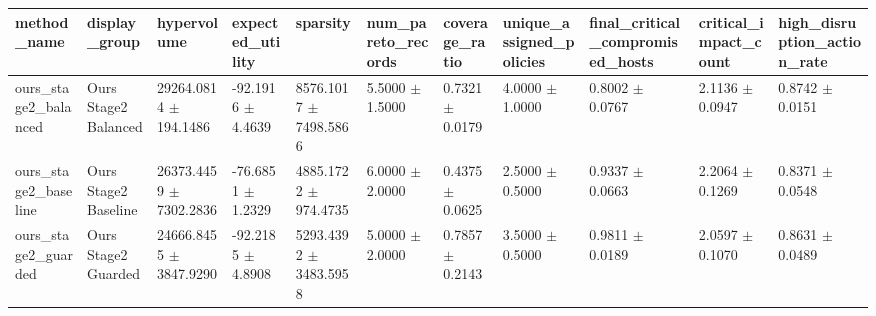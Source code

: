 \begin{tabular}{lllllllllll}
\hline
method_name & display_group & hypervolume & expected_utility & sparsity & num_pareto_records & coverage_ratio & unique_assigned_policies & final_critical_compromised_hosts & critical_impact_count & high_disruption_action_rate \\
\hline
ours_stage2_balanced & Ours Stage2 Balanced & 29264.0814 $\pm$ 194.1486 & -92.1916 $\pm$ 4.4639 & 8576.1017 $\pm$ 7498.5866 & 5.5000 $\pm$ 1.5000 & 0.7321 $\pm$ 0.0179 & 4.0000 $\pm$ 1.0000 & 0.8002 $\pm$ 0.0767 & 2.1136 $\pm$ 0.0947 & 0.8742 $\pm$ 0.0151 \\
ours_stage2_baseline & Ours Stage2 Baseline & 26373.4459 $\pm$ 7302.2836 & -76.6851 $\pm$ 1.2329 & 4885.1722 $\pm$ 974.4735 & 6.0000 $\pm$ 2.0000 & 0.4375 $\pm$ 0.0625 & 2.5000 $\pm$ 0.5000 & 0.9337 $\pm$ 0.0663 & 2.2064 $\pm$ 0.1269 & 0.8371 $\pm$ 0.0548 \\
ours_stage2_guarded & Ours Stage2 Guarded & 24666.8455 $\pm$ 3847.9290 & -92.2185 $\pm$ 4.8908 & 5293.4392 $\pm$ 3483.5958 & 5.0000 $\pm$ 2.0000 & 0.7857 $\pm$ 0.2143 & 3.5000 $\pm$ 0.5000 & 0.9811 $\pm$ 0.0189 & 2.0597 $\pm$ 0.1070 & 0.8631 $\pm$ 0.0489 \\
\hline
\end{tabular}